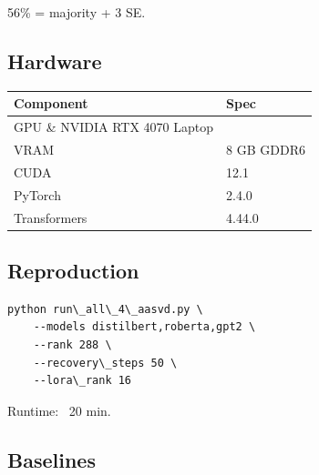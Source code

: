 56\% = majority + 3 SE.

\subsection{Hardware}

\begin{table}[H]
\centering
\small
\begin{tabular}{ll}
\toprule
\textbf{Component} & \textbf{Spec} \\
\midrule
GPU \& NVIDIA RTX 4070 Laptop \\
VRAM & 8 GB GDDR6 \\
CUDA & 12.1 \\
PyTorch & 2.4.0 \\
Transformers & 4.44.0 \\
\bottomrule
\end{tabular}
\end{table}

\subsection{Reproduction}

\begin{lstlisting}
python run\_all\_4\_aasvd.py \
    --models distilbert,roberta,gpt2 \
    --rank 288 \
    --recovery\_steps 50 \
    --lora\_rank 16
\end{lstlisting}

Runtime: ~20 min.

\subsection{Baselines}
